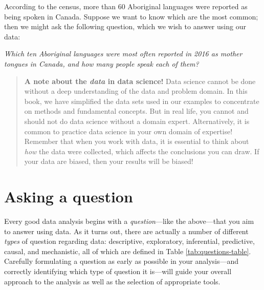\documentclass[
]{book}
\begin{document}
According to the census, more than 60 Aboriginal languages were reported
as being spoken in Canada. Suppose we want to know which are the most common;
then we might ask the following question, which we wish to answer using our data:

\emph{Which ten Aboriginal languages were most often reported in 2016 as mother
tongues in Canada, and how many people speak each of them?}

\begin{quote}
\textbf{A note about the \emph{data} in data science!}
Data science cannot be done without a deep understanding of the data and
problem domain. In this book, we have simplified the data sets used in our
examples to concentrate on methods and fundamental concepts. But in real
life, you cannot and should not do data science without a domain expert.
Alternatively, it is common to practice data science in your own domain of
expertise! Remember that when you work with data, it is essential to think
about \emph{how} the data were collected, which affects the conclusions you can
draw. If your data are biased, then your results will be biased!
\end{quote}

\hypertarget{asking-a-question}{%
\section{Asking a question}\label{asking-a-question}}

Every good data analysis begins with a \emph{question}---like the
above---that you aim to answer using data. As it turns out, there
are actually a number of different \emph{types} of question regarding data:
descriptive, exploratory, inferential, predictive, causal, and mechanistic,
all of which are defined in Table \ref{tab:questions-table}.
Carefully formulating a question as early as possible in your analysis---and
correctly identifying which type of question it is---will guide your overall approach to
the analysis as well as the selection of appropriate tools.
\end{document}
